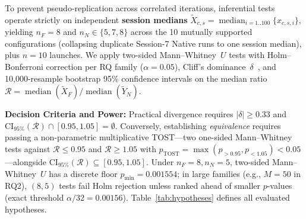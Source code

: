 \begin{table}[t]
\caption{Raw Data Accounting and Audit Exclusion Flow}
\label{tab:exclusions}
\centering
{}
\end{table}

To prevent pseudo-replication across correlated iterations, inferential tests operate strictly on independent \textbf{session medians} $\tilde{X}_{c,s} = \operatorname{median}_{i=1..100}\{x_{c,s,i}\}$, yielding $n_F = 8$ and $n_N \in \{5, 7, 8\}$ across the 10 mutually supported configurations (collapsing duplicate Session-7 Native runs to one session median), plus $n=10$ launches. We apply two-sided Mann--Whitney~$U$ tests with Holm--Bonferroni correction per RQ family ($\alpha=0.05$), Cliff's dominance~$\delta$~\cite{cliff1993dominance}, and 10,000-resample bootstrap 95\% confidence intervals on the median ratio $\mathcal{R} = \operatorname{median}(\tilde{X}_F)/\operatorname{median}(\tilde{Y}_N)$.

\textbf{Decision Criteria and Power:} Practical divergence requires $|\delta| \ge 0.33$ and $\text{CI}_{95\%}(\mathcal{R}) \cap [0.95, 1.05] = \emptyset$. Conversely, establishing \textit{equivalence} requires passing a non-parametric multiplicative TOST---two one-sided Mann--Whitney tests against $\mathcal{R} \le 0.95$ and $\mathcal{R} \ge 1.05$ with $p_{\mathrm{TOST}} = \max(p_{>0.95}, p_{<1.05}) < 0.05$---alongside $\text{CI}_{95\%}(\mathcal{R}) \subseteq [0.95, 1.05]$. Under $n_F=8, n_N=5$, two-sided Mann--Whitney~$U$ has a discrete floor $p_{\min} = 0.001554$; in large families (e.g., $M=50$ in RQ2), $(8,5)$ tests fail Holm rejection unless ranked ahead of smaller $p$-values (exact threshold $\alpha/32 = 0.00156$). Table~\ref{tab:hypotheses} defines all evaluated hypotheses.

